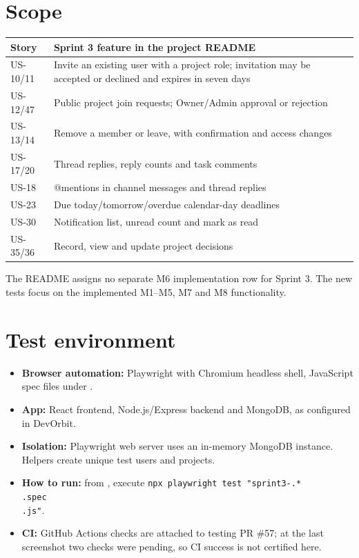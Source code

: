 \documentclass[11pt,a4paper]{article}
\begin{document}
\section{Scope}
\begin{center}\small{}
\begin{tabularx}{\linewidth}{l X}\toprule
\textbf{Story} & \textbf{Sprint 3 feature in the project README}\\\midrule
US-10/11 & Invite an existing user with a project role; invitation may be accepted or declined and expires in seven days\\
US-12/47 & Public project join requests; Owner/Admin approval or rejection\\
US-13/14 & Remove a member or leave, with confirmation and access changes\\
US-17/20 & Thread replies, reply counts and task comments\\
US-18 & @mentions in channel messages and thread replies\\
US-23 & Due today/tomorrow/overdue calendar-day deadlines\\
US-30 & Notification list, unread count and mark as read\\
US-35/36 & Record, view and update project decisions\\
\bottomrule\end{tabularx}\end{center}
The README assigns no separate M6 implementation row for Sprint 3. The new tests focus on the implemented M1--M5, M7 and M8 functionality.
\section{Test environment}
\begin{itemize}
\item \textbf{Browser automation:} Playwright with Chromium headless shell, JavaScript spec files under .
\item \textbf{App:} React frontend, Node.js/Express backend and MongoDB, as configured in DevOrbit.
\item \textbf{Isolation:} Playwright web server uses an in-memory MongoDB instance. Helpers create unique test users and projects.
\item \textbf{How to run:} from , execute \texttt{npx playwright test "sprint3-.*\\.spec\\.js"}.
\item \textbf{CI:} GitHub Actions checks are attached to testing PR \#57; at the last screenshot two checks were pending, so CI success is not certified here.
\end{itemize}
\end{document}
